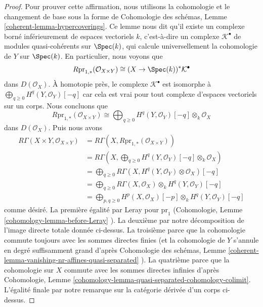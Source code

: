 \begin{proof}
\medskip\noindent
Pour prouver cette affirmation, nous utilisons la cohomologie et le
changement de base sous la forme de Cohomologie des schémas, Lemme
\ref{coherent-lemma-hypercoverings}. Ce lemme nous dit qu'il existe un complexe
borné inférieurement de espaces vectoriels $k$, c'est-à-dire un complexe
$\mathcal{K}^\bullet$ de modules quasi-cohérents sur $\Spec(k)$, qui calcule
universellement la cohomologie de $Y$ sur $\Spec(k)$. En particulier, nous voyons que
$$
R\text{pr}_{1, *}(\mathcal{O}_{X \times Y}) \cong
(X \to \Spec(k))^*\mathcal{K}^\bullet
$$
dans $D(\mathcal{O}_X)$. À homotopie près, le complexe
$\mathcal{K}^\bullet$ est isomorphe à $\bigoplus_{q \geq 0}
H^q(Y, \mathcal{O}_Y)[-q]$ car cela est vrai pour tout
complexe d'espaces vectoriels sur un corps. Nous concluons que
$$
R\text{pr}_{1, *}(\mathcal{O}_{X \times Y}) \cong
\bigoplus\nolimits_{q \geq 0}
H^q(Y, \mathcal{O}_Y)[-q] \otimes_k \mathcal{O}_X
$$
dans $D(\mathcal{O}_X)$. Puis nous avons
\begin{align*}
R\Gamma(X \times Y, \mathcal{O}_{X \times Y})
& =
R\Gamma(X, R\text{pr}_{1, *}(\mathcal{O}_{X \times Y})) \\
& =
R\Gamma(X, \bigoplus\nolimits_{q \geq 0}
H^q(Y, \mathcal{O}_Y)[-q] \otimes_k \mathcal{O}_X) \\
& =
\bigoplus\nolimits_{q \geq 0}
R\Gamma(X,  H^q(Y, \mathcal{O}_Y) \otimes \mathcal{O}_X)[-q] \\
& =
\bigoplus\nolimits_{q \geq 0}
R\Gamma(X, \mathcal{O}_X) \otimes_k H^q(Y, \mathcal{O}_Y)[-q] \\
& =
\bigoplus\nolimits_{p, q \geq 0}
H^p(X, \mathcal{O}_X)[-p] \otimes_k H^q(Y, \mathcal{O}_Y)[-q]
\end{align*}
comme désiré. La première égalité par Leray pour
$\text{pr}_1$ (Cohomologie, Lemme
\ref{cohomology-lemma-before-Leray} ). La deuxième par notre
décomposition de l'image directe totale donnée ci-dessus. La
troisième parce que la cohomologie commute toujours avec les
sommes directes finies (et la cohomologie de $Y$ s'annule en
degré suffisamment grand d'après Cohomologie des schémas, Lemme
\ref{coherent-lemma-vanishing-nr-affines-quasi-separated} ). La
quatrième parce que la cohomologie sur $X$ commute avec les
sommes directes infinies d'après Cohomologie, Lemme
\ref{cohomology-lemma-quasi-separated-cohomology-colimit}. L'égalité
finale par notre remarque sur la catégorie dérivée d'un corps ci-dessus.
\end{proof}








